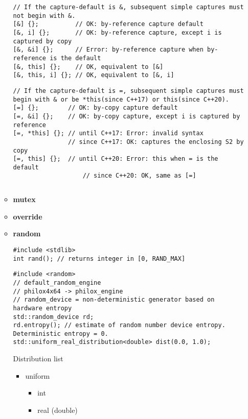 \documentclass{article}
\begin{document}
\begin{itemize}
\begin{itemize}
		            \begin{lstlisting}[style=cpp]
// If the capture-default is &, subsequent simple captures must not begin with &. 
[&] {};          // OK: by-reference capture default
[&, i] {};       // OK: by-reference capture, except i is captured by copy
[&, &i] {};      // Error: by-reference capture when by-reference is the default
[&, this] {};    // OK, equivalent to [&]
[&, this, i] {}; // OK, equivalent to [&, i]
         \end{lstlisting}
		            \begin{lstlisting}[style=cpp]
// If the capture-default is =, subsequent simple captures must begin with & or be *this(since C++17) or this(since C++20). 
[=] {};        // OK: by-copy capture default
[=, &i] {};    // OK: by-copy capture, except i is captured by reference
[=, *this] {}; // until C++17: Error: invalid syntax
               // since C++17: OK: captures the enclosing S2 by copy
[=, this] {};  // until C++20: Error: this when = is the default
                   // since C++20: OK, same as [=]
         \end{lstlisting}
		            \begin{lstlisting}[style=cpp]
         \end{lstlisting}
		      \item \textbf{mutex}
		      \item \textbf{override}
		      \item \textbf{random}
		            \begin{lstlisting}[style=cpp]
#include <stdlib>
int rand(); // returns integer in [0, RAND_MAX]
         \end{lstlisting}
		            \begin{lstlisting}[style=cpp]
#include <random>
// default_random_engine
// philox4x64 -> philox_engine
// random_device = non-deterministic generator based on hardware entropy
std::random_device rd;
rd.entropy(); // estimate of random number device entropy. Deterministic entropy = 0.
std::uniform_real_distribution<double> dist(0.0, 1.0);
         \end{lstlisting}
		            Distribution list
		            \begin{itemize}
			            \item uniform
			                  \begin{itemize}
				                  \item int
				                  \item real (double)

\end{itemize}
\end{itemize}
\end{itemize}
\end{itemize}
\end{document}
